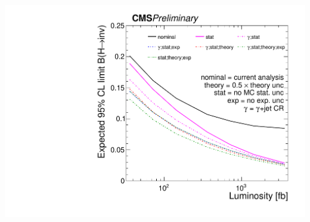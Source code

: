 \documentclass[aspectratio=169,xcolor=dvipsnames,,table,compress]{beamer}
\begin{document}
\begin{frame}
\begin{columns}[T]
\begin{column}{0.33\textwidth}
      \includegraphics[width=\textwidth]{../figures/vbf/projection/projection_compare_3.pdf}
    \end{column}
  \end{columns}
\end{frame}
\end{document}
